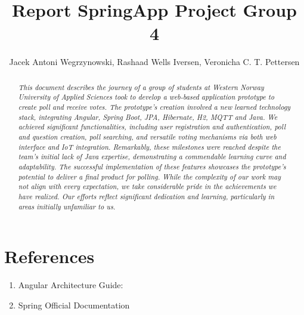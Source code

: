 \documentclass[11pt]{article}
\begin{document}
\title{Report SpringApp Project Group 4}

\author{Jacek Antoni Wegrzynowski, Rashaad Wells Iversen, Veronicha C. T. Pettersen }

\maketitle

\begin{abstract}

\noindent \textit{This document describes the journey of a group of students at Western Norway University of Applied Sciences took to develop a web-based application prototype to create poll and receive votes.  The prototype's creation involved a new learned technology stack, integrating Angular, Spring Boot, JPA, Hibernate, H2, MQTT and Java.  We achieved significant functionalities, including user registration and authentication, poll and question creation, poll searching, and versatile voting mechanisms via both web interface and IoT integration.  Remarkably, these milestones were reached despite the team's initial lack of Java expertise, demonstrating a commendable learning curve and adaptability.  The successful implementation of these features showcases the prototype's potential to deliver a final product for polling.  While the complexity of our work may not align with every expectation, we take considerable pride in the achievements we have realized.  Our efforts reflect significant dedication and learning, particularly in areas initially unfamiliar to us.}

\end{abstract}

%













\section*{References}
\begin{enumerate}
	\item Angular Architecture Guide: %
	\item Spring Official Documentation %
\end{enumerate}


{}
\end{document}
